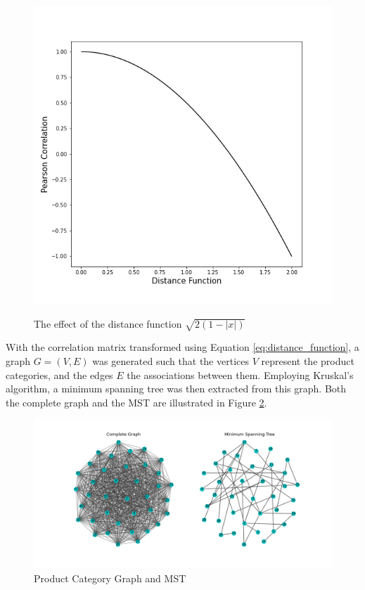 \documentclass[paper=a4,fontsize=11pt]{report}	%
\begin{document}
\begin{figure}[H]
\centering
\includegraphics[scale=0.4]{distance_function}
\label{fig:distance_function}
\caption{The effect of the distance function $\sqrt{2(1-|x|)}$}
\end{figure}
With the correlation matrix transformed using Equation \ref{eq:distance_function}, a graph $G = (V,E)$ was generated such that the vertices $V$ represent the product categories, and the edges $E$ the associations between them. Employing Kruskal's algorithm, a minimum spanning tree was then extracted from this graph. Both the complete graph and the MST are illustrated in Figure \ref{fig:graph_mst}.

\begin{figure}[H]
\centering
\includegraphics[scale=0.31]{graph_and_mst_no_fuel}
\caption{Product Category Graph and MST}
\label{fig:graph_mst}
\end{figure}
\end{document}
